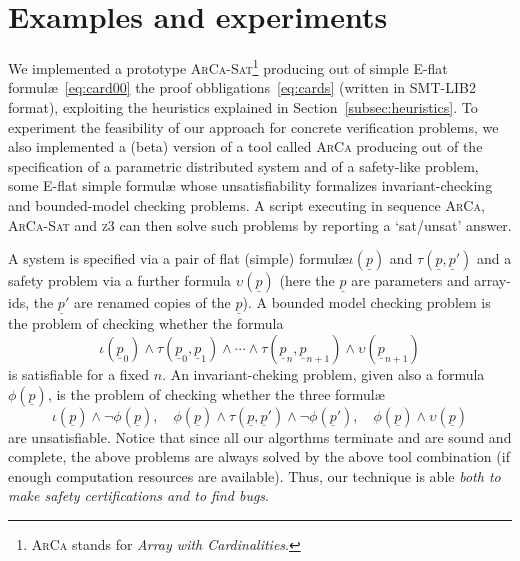 \documentclass[11pt,a4paper]{article}
\newcommand{\formulae}{formul\ae\xspace}
\newcommand{\up}{\ensuremath{\underline p}}
\begin{document}
{\section{Examples and experiments}\label{sec:experiments}

We implemented a prototype \textsc{ArCa-Sat}\footnote{\textsc{ArCa} stands for \emph{Array with Cardinalities}.} producing out of  simple E-flat \formulae~\eqref{eq:card00} the  proof obbligations~\eqref{eq:cards} (written  in SMT-LIB2 format), exploiting the heuristics 
explained in Section~\ref{subsec:heuristics}. To experiment the feasibility of our approach for concrete verification problems, we also implemented a (beta) version of a tool called \textsc{ArCa} producing out of the
specification of a parametric distributed system and of a safety-like problem, some E-flat simple \formulae whose unsatisfiability formalizes invariant-checking and bounded-model checking problems. A script executing in sequence 
\textsc{ArCa},  \textsc{ArCa-Sat} and \textsc{z3} can then solve such problems by reporting a `sat/unsat' answer.

A system is specified via a pair of flat (simple) \formulae $\iota(\up)$ and $\tau(\up, \up')$
and a safety problem via a further formula $\upsilon(\up)$ (here the $\up$ are parameters and array-ids, the $\up'$ are renamed copies of the $\up$).
A bounded model checking problem is the problem of checking whether the formula
$$
\iota(\up_0) \wedge \tau(\up_0, \up_1)\wedge\cdots\wedge \tau(\up_n, \up_{n+1})\wedge \upsilon(\up_{n+1})
$$
is satisfiable for a fixed $n$. An invariant-cheking problem, given also a formula $\phi(\up)$, is the problem of checking whether the three \formulae
$$
\iota(\up)\wedge \neg \phi(\up), \quad \phi(\up)\wedge \tau(\up, \up') \wedge \neg \phi(\up'), \quad \phi(\up)\wedge \upsilon(\up)
$$
are unsatisfiable. Notice that since all our algorthms terminate and are sound and complete, the above  problems are always solved by the above tool combination (if enough
computation resources are available). Thus, our technique is able \emph{both to make safety certifications and to find bugs}.

}
\end{document}
